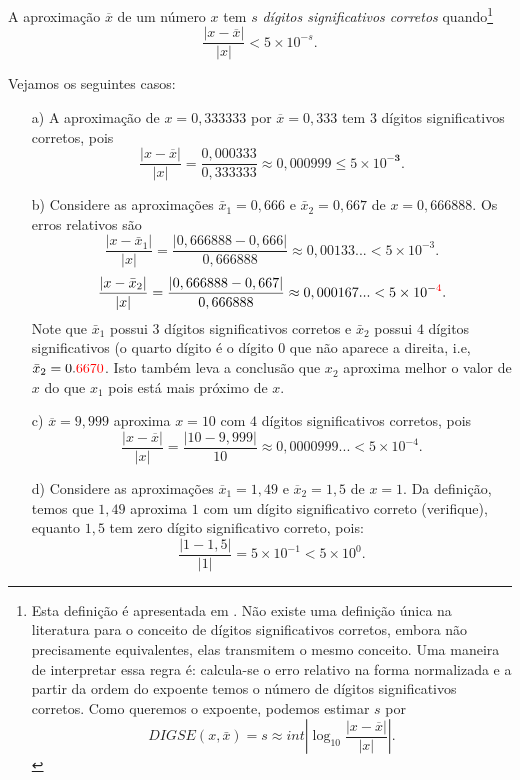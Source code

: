 \begin{defn}
A aproximação $\overline{x}$ de um número $x$ tem $s$ \emph{dígitos significativos corretos} quando\footnote{Esta definição é apresentada em \cite{Burden2013}. Não existe uma definição única na literatura para o conceito de dígitos significativos corretos, embora não precisamente equivalentes, elas transmitem o mesmo conceito.
Uma maneira de interpretar essa regra é: calcula-se o erro relativo na forma normalizada e a partir da ordem do expoente temos o número de dígitos significativos corretos. Como queremos o expoente, podemos estimar $s$ por
$$ DIGSE(x,\bar{x})=s \approx int \left|\log_{10} \frac{|x-\overline{x}|}{|x|}\right|. $$
}
$$
\frac{|x-\overline{x}|}{|x|} < 5\times 10^{-s}.
$$
\end{defn}


\begin{ex} Vejamos os seguintes casos:
\begin{itemize}
\item[a)] A aproximação de $x=0,333333$ por $\overline{x}=0,333$ tem $3$ dígitos significativos corretos, pois
  \begin{equation*}
    \frac{|x-\overline{x}|}{|x|} = \frac{0,000333}{0,333333} \approx 0,000999 \leq 5\times 10^{-\pmb{3}}.
  \end{equation*}
\item[b)] Considere as aproximações $\bar{x}_1=0,666$ e $\bar{x}_2=0,667$ de $x=0,666888$. Os erros relativos são
  $$
    \frac{|x-\bar{x}_1|}{|x|} = \frac{|0,666888-0,666|}{0,666888} \approx 0,00133...< 5\times 10^{-3}.
  $$
  $$
    \frac{|x-\bar{x}_2|}{|x|} = \frac{|0,666888-0,667|}{0,666888} \approx 0,000167...< 5\times 10^{-{\color{red}{4}}}.
  $$
  Note que $\bar{x}_1$ possui $3$ dígitos significativos corretos e $\bar{x}_2$ possui $4$ dígitos significativos (o quarto dígito é o dígito $0$ que não aparece a direita, i.e, $\bar{x}_2=0.{\color{red}{6670}}$. Isto também leva a conclusão que $x_2$ aproxima melhor o valor de $x$ do que $x_1$ pois está mais próximo de $x$.
  
\item[c)] $\overline{x} = 9,999$ aproxima $x = 10$ com $4$ dígitos significativos corretos, pois  
  \begin{equation*}
    \frac{|x-\overline{x}|}{|x|} = \frac{|10 - 9,999|}{10} \approx 0,0000999...< 5\times 10^{-4}.
  \end{equation*}
\item[d)] Considere as aproximações $\overline{x}_1 = 1,49$ e $\overline{x}_2 = 1,5$ de $x = 1$. Da definição, temos que $1,49$ aproxima $1$ com um dígito significativo correto (verifique), equanto $1,5$ tem zero dígito significativo correto, pois:
  \begin{equation*}
    \frac{|1-1,5|}{|1|} = 5\times 10^{-1} < 5\times 10^{0}.
  \end{equation*}
\end{itemize}
\end{ex}

